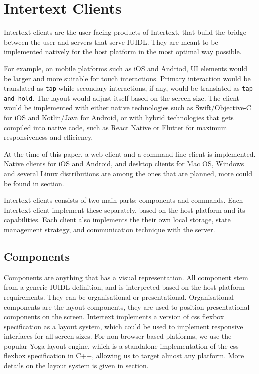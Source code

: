 
\section{Intertext Clients} \label{intertextClients}

Intertext clients are the user facing products of Intertext, that build the bridge between the user and servers that serve IUIDL. They are meant to be implemented natively for the host platform in the most optimal way possible. 

For example, on mobile platforms such as iOS and Andriod, UI elements would be larger and more suitable for touch interactions. Primary interaction would be translated as \texttt{tap} while secondary interactions, if any, would be translated as \texttt{tap and hold}. The layout would adjust itself based on the screen size. The client would be implemented with either native technologies such as Swift/Objective-C for iOS and Kotlin/Java for Android, or with hybrid technologies that gets compiled into native code, such as React Native or Flutter for maximum responsiveness and efficiency. 

At the time of this paper, a web client and a command-line client is implemented. Native clients for iOS and Android, and desktop clients for Mac OS, Windows and several Linux distributions are among the ones that are planned, more could be found in  section.

Intertext clients consists of two main parts; components and commands. Each Intertext client implement these separately, based on the host platform and its capabilities. Each client also implements the  their own local storage, state management strategy, and communication technique with the server.

\subsection{Components}

Components are anything that has a visual representation. All component stem from a generic IUIDL definition, and is interpreted based on the host platform requirements. They can be organisational or presentational. Organisational components are the layout components, they are used to position presentational components on the screen. Intertext implements a version of css flexbox specification as a layout system, which could be used to implement responsive interfaces for all screen sizes. For non browser-based platforms, we use the popular Yoga layout engine, which is a standalone implementation of the css flexbox specification in C++, allowing us to target almost any platform. More details on the layout system is given in  section.

